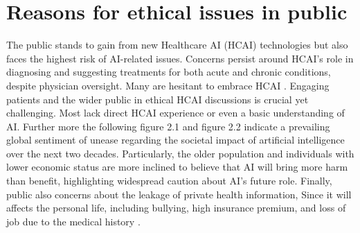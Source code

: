 \documentclass[paper=a4, fontsize=11pt]{scrartcl} %
\numberwithin{equation}{section} %
\numberwithin{figure}{section} %
\numberwithin{table}{section} %
\begin{document}
\section{Reasons for ethical issues in public}

The public stands to gain from new Healthcare AI (HCAI) technologies but also faces the highest risk of 
AI-related issues. Concerns persist around HCAI's role in diagnosing and suggesting treatments 
for both acute and chronic conditions, despite physician oversight. Many are hesitant to embrace HCAI \cite{esmaeilzadehPatientsPerceptionsHuman2021}. 
Engaging patients and the wider public in ethical HCAI discussions is crucial yet challenging. 
Most lack direct HCAI experience or even a basic understanding of AI. Further more the following figure 2.1 and figure 2.2 indicate a prevailing 
global sentiment of unease regarding the societal impact of artificial intelligence over the next two decades. 
Particularly, the older population and individuals with lower economic status are more inclined to believe that 
AI will bring more harm than benefit, highlighting widespread caution about AI's future role.
Finally, public also concerns about the leakage of private health information, Since it will affects the personal life, including bullying, high insurance premium,
and loss of job due to the medical history \cite{Thapa2021PrecisionHealthData}.


\end{document}
